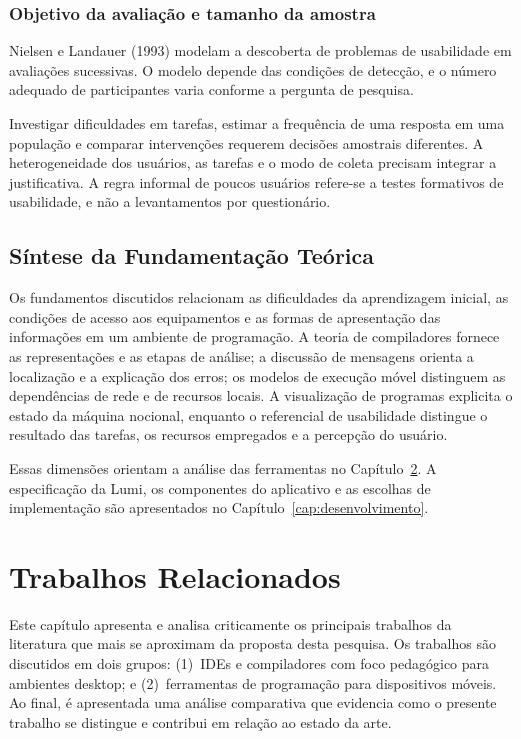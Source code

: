 \documentclass[
    12pt
    ,oneside
    ,a4paper
    ,chapter=TITLE
    ,section=TITLE
    ,sumario=abnt-6027-2012]{abntex2}
\begin{document}
\subsection{Objetivo da avaliação e tamanho da amostra}
Nielsen e Landauer (1993) modelam a descoberta de problemas de usabilidade em
avaliações sucessivas. O modelo depende das condições de detecção, e o número adequado de participantes varia conforme a pergunta de pesquisa.

Investigar dificuldades em tarefas, estimar a frequência de uma resposta em uma
população e comparar intervenções requerem decisões amostrais diferentes. A
heterogeneidade dos usuários, as tarefas e o modo de coleta precisam integrar
a justificativa. A regra informal de poucos usuários refere-se a testes formativos de usabilidade, e não a levantamentos por questionário.

\section{Síntese da Fundamentação Teórica}

Os fundamentos discutidos relacionam as dificuldades da aprendizagem inicial,
as condições de acesso aos equipamentos e as formas de apresentação das
informações em um ambiente de programação. A teoria de compiladores fornece as
representações e as etapas de análise; a discussão de mensagens orienta a
localização e a explicação dos erros; os modelos de execução móvel distinguem as
dependências de rede e de recursos locais. A visualização de programas explicita
o estado da máquina nocional, enquanto o referencial de usabilidade distingue
o resultado das tarefas, os recursos empregados e a percepção do usuário.

Essas dimensões orientam a análise das ferramentas no
Capítulo~\ref{cap:trabalhos_relacionados}. A especificação da Lumi, os componentes
do aplicativo e as escolhas de implementação são apresentados no
Capítulo~\ref{cap:desenvolvimento}.

\chapter{Trabalhos Relacionados}
\label{cap:trabalhos_relacionados}

Este capítulo apresenta e analisa criticamente os principais trabalhos da literatura que mais
se aproximam da proposta desta pesquisa. Os trabalhos são discutidos em dois grupos: (1)~IDEs
e compiladores com foco pedagógico para ambientes desktop; e (2)~ferramentas de programação
para dispositivos móveis. Ao final, é apresentada uma análise comparativa que evidencia como
o presente trabalho se distingue e contribui em relação ao estado da arte.
\end{document}
